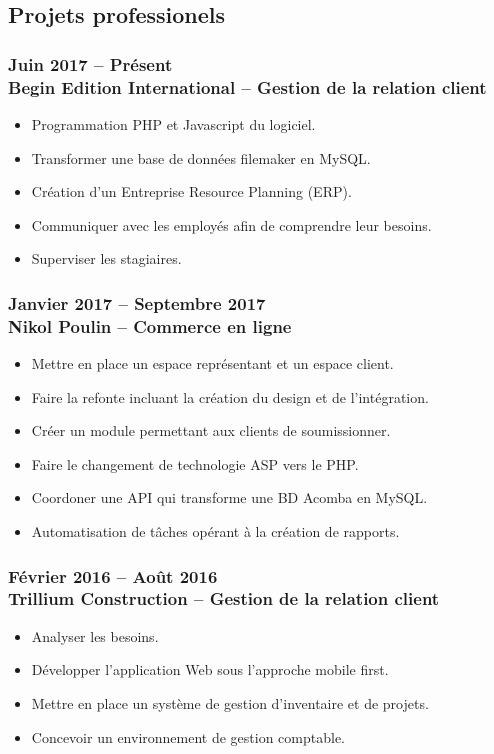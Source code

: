 \documentclass{resume}
\begin{document}
	\begin{multicols}{2}
		\subsection*{Projets professionels}
			\subsubsection*{Juin 2017 – Présent \\ Begin Edition International – Gestion de la relation client}
			\begin{itemize}
				\scriptsize
				\item Programmation PHP et Javascript du logiciel.
				\item Transformer une base de données filemaker en MySQL.
				\item Création d'un Entreprise Resource Planning (ERP).
				\item Communiquer avec les employés afin de comprendre leur besoins.
				\item Superviser les stagiaires.
			\end{itemize}

			\subsubsection*{Janvier 2017 – Septembre 2017 \\ Nikol Poulin – Commerce en ligne}
			\begin{itemize}
				\scriptsize
				\item Mettre en place un espace représentant et un espace client.
				\item Faire la refonte incluant la création du design et de l'intégration.
				\item Créer un module permettant aux clients de soumissionner.
				\item Faire le changement de technologie ASP vers le PHP.
				\item Coordoner une API qui transforme une BD Acomba en MySQL.
				\item Automatisation de tâches opérant à la création de rapports.
			\end{itemize}

			\subsubsection*{Février 2016 – Août 2016 \\ Trillium Construction – Gestion de la relation client}
			\begin{itemize}
				\scriptsize
				\item Analyser les besoins.
				\item Développer l'application Web sous l'approche mobile first.
				\item Mettre en place un système de gestion d'inventaire et de projets.
				\item Concevoir un environnement de gestion comptable.
			\end{itemize}


\end{multicols}
\end{document}
